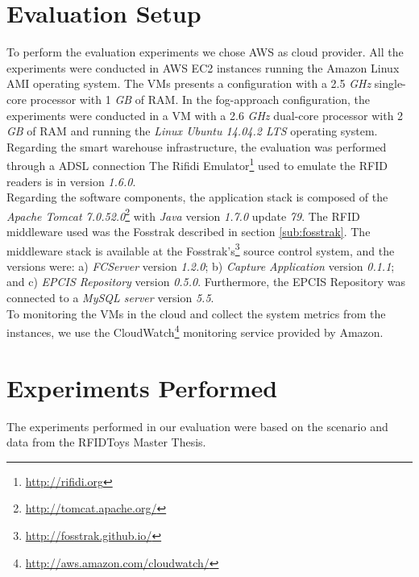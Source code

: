 \section{Evaluation Setup}
\label{sec:eval_setup}
To perform the evaluation experiments we chose \gls{AWS} as cloud provider. All the experiments were
conducted in \gls{AWS} \gls{EC2} instances running the Amazon Linux AMI operating system. The \glspl{VM}
presents a configuration with a 2.5 \textit{\gls{GHz}} single-core processor with 1 \textit{\gls{GB}} of
\gls{RAM}. In the fog-approach configuration, the experiments were conducted in a \gls{VM} with
a 2.6 \textit{\gls{GHz}} dual-core processor with 2 \textit{\gls{GB}} of \gls{RAM} and running
the \textit{Linux Ubuntu 14.04.2 LTS} operating system. Regarding the smart warehouse infrastructure,
the evaluation was performed through a \gls{ADSL} connection The Rifidi Emulator\footnote{\url{http://rifidi.org}}
used to emulate the \gls{RFID} readers is in version \textit{1.6.0}.\\

Regarding the software components, the application stack is composed of the \textit{Apache Tomcat 7.0.52.0}\footnote{\url{http://tomcat.apache.org/}}
with \textit{Java} version \textit{1.7.0} update \textit{79}. The \gls{RFID} middleware used was the Fosstrak
described in section \ref{sub:fosstrak}. The middleware stack is available at the Fosstrak's\footnote{\url{http://fosstrak.github.io/}}
source control system, and the versions were: a) \textit{\gls{FCServer}} version \textit{1.2.0}; b) \textit{Capture Application}
version \textit{0.1.1}; and c) \textit{\gls{EPCIS} Repository} version \textit{0.5.0}. Furthermore,
the \gls{EPCIS} Repository was connected to a \textit{MySQL server} version \textit{5.5}.\\

To monitoring the \glspl{VM} in the cloud and collect the system metrics from the instances, we use the
CloudWatch\footnote{\url{http://aws.amazon.com/cloudwatch/}} monitoring service provided by Amazon.

\section{Experiments Performed}
\label{sec:eval_experiments}
The experiments performed in our evaluation were based on the scenario and data from the RFIDToys \cite{Correia:Thesis:2014}
Master Thesis.

